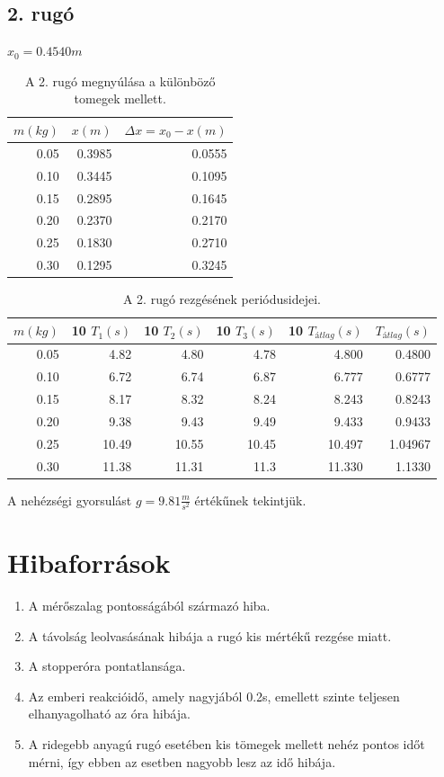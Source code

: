\documentclass[10pt,pdftex]{report}
\begin{document}
\subsection*{2. rugó}
$x_0=0.4540m$
\begin{table}[H]
    \centering
    \begin{tabular}{|r|r|r|}
        \hline
        $m(kg)$ & $x(m)$ & $\Delta x=x_0-x(m)$ \\
        \hline
        0.05 & 0.3985 & 0.0555 \\
        \hline
        0.10 & 0.3445 & 0.1095 \\
        \hline
        0.15 & 0.2895 & 0.1645 \\
        \hline
        0.20 & 0.2370 & 0.2170 \\
        0.25 & 0.1830 & 0.2710 \\
        \hline
        0.30 & 0.1295 & 0.3245 \\
        \hline
    \end{tabular}
    \caption{A 2. rugó megnyúlása a különböző tomegek mellett.}
\end{table}
\begin{table}[H]
    \centering
    \begin{tabular}{|r|r|r|r|r|r|}
        \hline
        $m(kg)$ & 10 $T_1(s)$ & 10 $T_2(s)$ & 10 $T_3(s)$ & 10 $T_{átlag}(s)$ & $T_{átlag}(s)$ \\
        \hline
        0.05 & 4.82 & 4.80 & 4.78 & 4.800 & 0.4800 \\
        \hline
        0.10 & 6.72 & 6.74 & 6.87 & 6.777 & 0.6777 \\
        \hline
        0.15 & 8.17 & 8.32 & 8.24 & 8.243 & 0.8243 \\
        \hline
        0.20 & 9.38 & 9.43 & 9.49 & 9.433 & 0.9433 \\
        \hline
        0.25 & 10.49 & 10.55 & 10.45 & 10.497 & 1.04967 \\
        \hline
        0.30 & 11.38 & 11.31 & 11.3 & 11.330 & 1.1330 \\
        \hline
    \end{tabular}
    \caption{A 2. rugó rezgésének periódusidejei.}
\end{table}
A nehézségi gyorsulást $g=9.81\frac{m}{s^2}$ értékűnek tekintjük.
\section*{Hibaforrások}
\begin{enumerate}
    \item{A mérőszalag pontosságából származó hiba.}
    \item{A távolság leolvasásának hibája a rugó kis mértékű rezgése miatt.}
    \item{A stopperóra pontatlansága.}
    \item{Az emberi reakcióidő, amely nagyjából 0.2s, emellett szinte teljesen elhanyagolható az óra hibája.}
    \item{A ridegebb anyagú rugó esetében kis tömegek mellett nehéz pontos időt mérni, így ebben az esetben nagyobb lesz az idő hibája.}
\end{enumerate}
\end{document}

